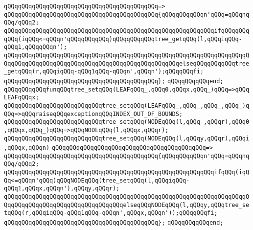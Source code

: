 \verb|qQQqqQQqqQQqqQQqqQQqqQQqqQQqqQQqqQQqqQQqqQQq=>|\newline
\verb|qQQqqQQqqQQqqQQqqQQqqQQqqQQqqQQqqQQqqQQqqQQq{qQQqqQQqqQQqn'qQQq=qQQqnqQQq/qQQq2;|\newline
\newline
\verb|qQQqqQQqqQQqqQQqqQQqqQQqqQQqqQQqqQQqqQQqqQQqqQQqqQQqqQQqqQQqifqQQqqQQqqQQq(iqQQq<=qQQqn'qQQqqQQqqQQq)qQQqqQQqqQQqtree_getqQQq(l,qQQqiqQQq-qQQq1,qQQqqQQqn');|\newline
\verb|qQQqqQQqqQQqqQQqqQQqqQQqqQQqqQQqqQQqqQQqqQQqqQQqqQQqqQQqqQQqqQQqqQQqqQQqqQQqqQQqqQQqqQQqqQQqqQQqqQQqqQQqqQQqqQQqqQQqqQQqelseqQQqqQQqqQQqtree_getqQQq(r,qQQqiqQQq-qQQq1qQQq-qQQqn',qQQqn');qQQqqQQqfi;|\newline
\verb|qQQqqQQqqQQqqQQqqQQqqQQqqQQqqQQqqQQqqQQqqQQq};|\newline
\verb|qQQqqQQqqQQqend;|\newline
\newline
\verb|qQQqqQQqqQQqfunqQQqtree_setqQQq(LEAFqQQq_,qQQq0,qQQqx,qQQq_)qQQq=>qQQqLEAFqQQqx;|\newline
\verb|qQQqqQQqqQQqqQQqqQQqqQQqqQQqtree_setqQQq(LEAFqQQq_,qQQq_,qQQq_,qQQq_)qQQq=>qQQqraiseqQQqexceptionqQQqINDEX_OUT_OF_BOUNDS;|\newline
\verb|qQQqqQQqqQQqqQQqqQQqqQQqqQQqtree_setqQQq(NODEqQQq(l,qQQq_,qQQqr),qQQq0,qQQqx,qQQq_)qQQq=>qQQqNODEqQQq(l,qQQqx,qQQqr);|\newline
\newline
\verb|qQQqqQQqqQQqqQQqqQQqqQQqqQQqtree_setqQQq(NODEqQQq(l,qQQqy,qQQqr),qQQqi,qQQqx,qQQqn)|\newline
\verb|qQQqqQQqqQQqqQQqqQQqqQQqqQQqqQQqqQQqqQQqqQQq=>|\newline
\verb|qQQqqQQqqQQqqQQqqQQqqQQqqQQqqQQqqQQqqQQqqQQq{qQQqqQQqqQQqn'qQQq=qQQqnqQQq/qQQq2;|\newline
\newline
\verb|qQQqqQQqqQQqqQQqqQQqqQQqqQQqqQQqqQQqqQQqqQQqqQQqqQQqqQQqqQQqifqQQq(iqQQq<=qQQqn'qQQq)qQQqNODEqQQq(tree_setqQQq(l,qQQqiqQQq-qQQq1,qQQqx,qQQqn'),qQQqy,qQQqr);|\newline
\verb|qQQqqQQqqQQqqQQqqQQqqQQqqQQqqQQqqQQqqQQqqQQqqQQqqQQqqQQqqQQqqQQqqQQqqQQqqQQqqQQqqQQqqQQqqQQqqQQqqQQqqQQqelseqQQqNODEqQQq(l,qQQqy,qQQqtree_setqQQq(r,qQQqiqQQq-qQQq1qQQq-qQQqn',qQQqx,qQQqn'));qQQqqQQqfi;|\newline
\verb|qQQqqQQqqQQqqQQqqQQqqQQqqQQqqQQqqQQqqQQqqQQq};|\newline
\verb|qQQqqQQqqQQqend;|\newline
\newline
